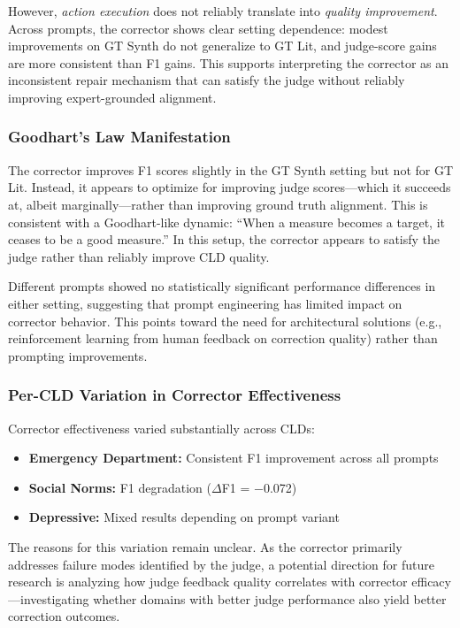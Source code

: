 However, \textit{action execution} does not reliably translate into \textit{quality improvement}. Across prompts, the corrector shows clear setting dependence: modest improvements on GT Synth do not generalize to GT Lit, and judge-score gains are more consistent than F1 gains. This supports interpreting the corrector as an inconsistent repair mechanism that can satisfy the judge without reliably improving expert-grounded alignment.

\subsubsection{Goodhart's Law Manifestation}

The corrector improves F1 scores slightly in the GT Synth setting but not for GT Lit. Instead, it appears to optimize for improving judge scores---which it succeeds at, albeit marginally---rather than improving ground truth alignment. This is consistent with a Goodhart-like dynamic: ``When a measure becomes a target, it ceases to be a good measure.'' In this setup, the corrector appears to satisfy the judge rather than reliably improve CLD quality.

Different prompts showed no statistically significant performance differences in either setting, suggesting that prompt engineering has limited impact on corrector behavior. This points toward the need for architectural solutions (e.g., reinforcement learning from human feedback on correction quality) rather than prompting improvements.

\subsubsection{Per-CLD Variation in Corrector Effectiveness}

Corrector effectiveness varied substantially across CLDs:
\begin{itemize}[noitemsep]
    \item \textbf{Emergency Department:} Consistent F1 improvement across all prompts
    \item \textbf{Social Norms:} F1 degradation ($\Delta$F1 = $-$0.072)
    \item \textbf{Depressive:} Mixed results depending on prompt variant
\end{itemize}

The reasons for this variation remain unclear. As the corrector primarily addresses failure modes identified by the judge, a potential direction for future research is analyzing how judge feedback quality correlates with corrector efficacy---investigating whether domains with better judge performance also yield better correction outcomes.

